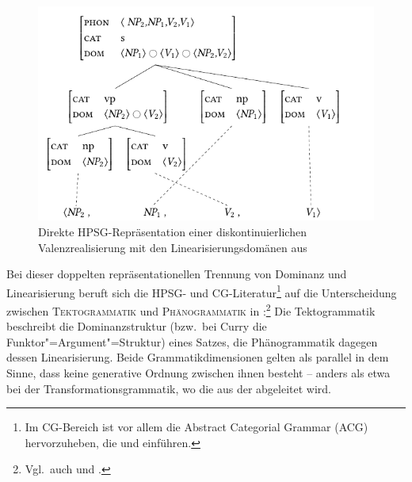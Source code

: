 \begin{figure}[t]
\centering
\includegraphics{graphics/abb64.pdf}
\caption{\label{fig-kohaerenz-strategien-2}Direkte HPSG-Repräsentation einer diskontinuierlichen Valenzrealisierung mit den Linearisierungsdomänen aus \cite{Reape:92,Reape:94,Reape:96}}
\end{figure}
 
\largerpage
Bei dieser doppelten repräsentationellen Trennung von Dominanz und Linearisierung beruft sich die HPSG- und CG-Literatur\footnote{Im CG-Bereich ist vor allem die Abstract Categorial Grammar (ACG) hervorzuheben, die \cite{deGroote:01} und \cite{Muskens:01} einführen.} auf die Unterscheidung zwischen \textsc{Tektogrammatik} und \textsc{Phänogrammatik} in \citet[65f]{Curry:63}:\footnote{Vgl.\ auch \citet[12ff]{Dowty:96} und \citet[35ff]{Kathol:00}.} Die Tektogrammatik beschreibt die Dominanzstruktur (bzw.\ bei Curry die Funktor"=Argument"=Struktur) eines Satzes, die Phänogrammatik dagegen dessen Linearisierung. Beide Grammatikdimensionen gelten als parallel in dem Sinne, dass keine generative Ordnung zwischen ihnen besteht -- anders als etwa bei der Transformationsgrammatik, wo die  aus der  abgeleitet wird. 


